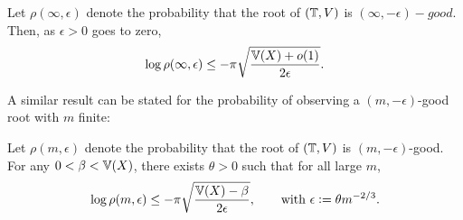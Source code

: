 \begin{theorem}\label{thm:infty_good}
Let $\rho(\infty, \epsilon)$ denote the probability that the root of $(\mathbb{T}, V)$ is $(\infty, - \epsilon)-good$. Then, as $\epsilon > 0$ goes to zero, 
\begin{equation}
\log\rho(\infty, \epsilon) \leq - \pi \sqrt{\frac{\mathbb{V}(X) + o(1)}{2 \epsilon}}. 
\end{equation}
\end{theorem}

A similar result can be stated for the probability of observing a $(m, - \epsilon)$-good root with $m$ finite:
\begin{theorem}\label{thm:finite_good}
Let $\rho(m, \epsilon)$ denote the probability that the root of $(\mathbb{T}, V)$ is $(m, - \epsilon)$-good. For any $0 < \beta < \mathbb{V}(X)$, there exists $\theta > 0$ such that for all large $m$, 
\begin{equation*}
\log \rho(m, \epsilon) \leq - \pi \sqrt{\frac{\mathbb{V}(X) - \beta}{2 \epsilon}}, \qquad \text{with } \epsilon \vcentcolon= \theta m^{-2/3}. 
\end{equation*}
\end{theorem}